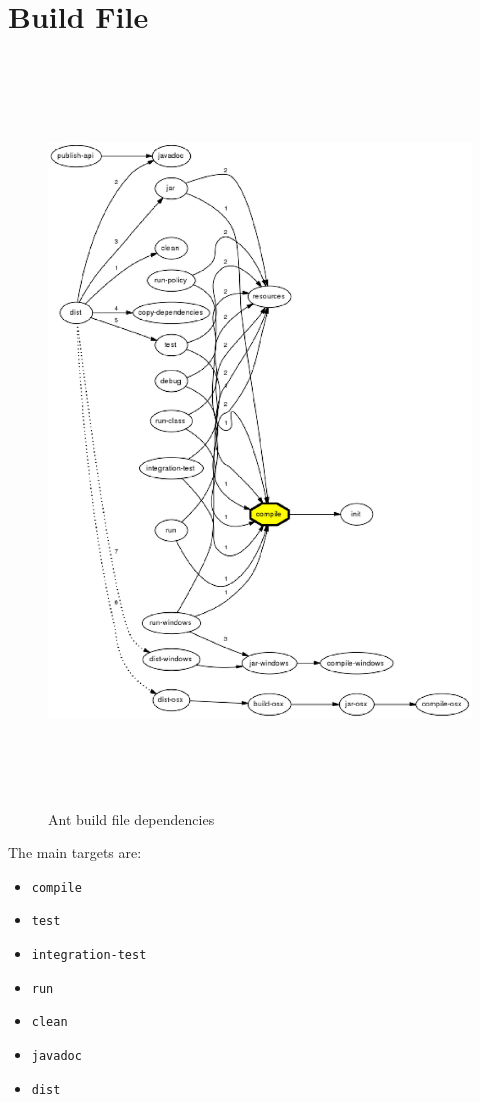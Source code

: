 \documentclass[11pt,a4paper]{article}
\begin{document}
\section{Build File}

\begin{figure}[H]
 \centering
 \includegraphics[width=15cm,height=19.84cm]{../images/developersguide/ant-graph.eps}
 \caption{Ant build file dependencies}
\end{figure}

The main targets are:
\begin{itemize}
 \item \texttt{compile}
 \item \texttt{test}
 \item \texttt{integration-test}
 \item \texttt{run}
 \item \texttt{clean}
 \item \texttt{javadoc}
 \item \texttt{dist}
\end{itemize}
\end{document}
